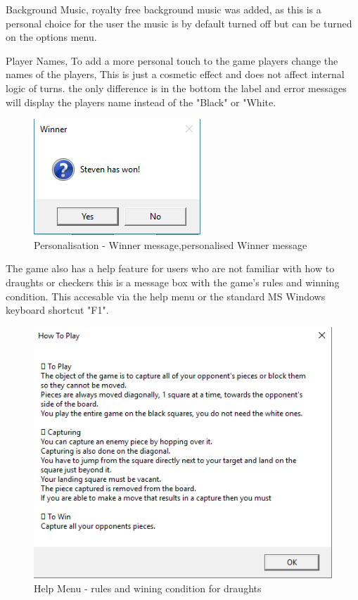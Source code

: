 \documentclass[10pt, a4paper]{article}
\begin{document}
Background Music, royalty free background music was added, as this is a personal choice for the user the music is by default turned off but can be turned on the options menu.

Player Names, To add a more personal touch to the game players change the names of the players, This is just a cosmetic effect and does not affect internal logic of turns. the only difference is in the bottom the label and error messages will display the players name instead of the "Black" or "White.
\begin{figure}[H]
  	\centering
  	\includegraphics[scale = 0.75]{Winner}
	\caption{Personalisation  - Winner message,personalised Winner message}
  	\label{fig:nonfloat}
	\end{figure}

The game also has a help feature for users who are not familiar with how to draughts or checkers this is a message box with the game's rules and winning condition. This accesable via the help menu or the standard MS Windows keyboard shortcut "F1".
\begin{figure}[H]
  	\centering
  	\includegraphics[scale = 0.75]{Help}
	\caption{Help Menu  - rules and wining condition for draughts}
  	\label{fig:nonfloat}
	\end{figure}
\end{document}
